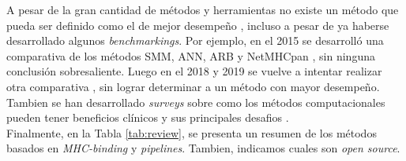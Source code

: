 A pesar de la gran cantidad de métodos y herramientas no existe un método que pueda ser definido como el de mejor desempeño \citep{de2020neoantigen}, incluso a pesar de ya haberse desarrollado algunos \textit{benchmarkings}. Por ejemplo, en el 2015 se desarrolló una comparativa de los métodos SMM, ANN, ARB y NetMHCpan \citep{trolle2015automated}, sin ninguna conclusión sobresaliente. Luego en el 2018 y 2019 se vuelve a intentar realizar otra comparativa \citep{bonsack2019performance, zhao2018systematically}, sin lograr determinar a un método con mayor desempeño. Tambien se han desarrollado \textit{surveys} sobre como los métodos computacionales pueden tener beneficios clínicos \citep{de2020neoantigen} y sus principales desafios \citep{chen2021challenges}. \\

Finalmente, en la Tabla \ref{tab:review}, se presenta un resumen de los métodos basados en \textit{MHC-binding} y \textit{pipelines}. Tambien, indicamos cuales son \textit{open source}.\\

